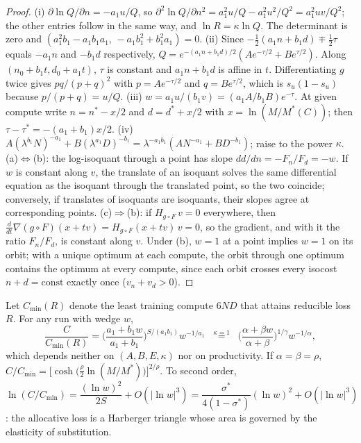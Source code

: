 \begin{proof}
(i) $\partial\ln Q/\partial n=-a_1u/Q$, so $\partial^2\ln Q/\partial n^2=a_1^2u/Q-a_1^2u^2/Q^2=a_1^2uv/Q^2$; the other
entries follow in the same way, and $\ln R=\kappa\ln Q$. The determinant is zero and
$(a_1^2b_1-a_1b_1a_1,\,-a_1b_1^2+b_1^2a_1)=0$. (ii) Since $-\frac12(a_1n+b_1d)\mp\frac12\tau$ equals $-a_1n$ and $-b_1d$
respectively, $Q=e^{-(a_1n+b_1d)/2}(Ae^{-\tau/2}+Be^{\tau/2})$. Along $(n_0+b_1t,d_0+a_1t)$, $\tau$ is constant and
$a_1n+b_1d$ is affine in $t$. Differentiating $g$ twice gives $pq/(p+q)^2$ with $p=Ae^{-\tau/2}$ and $q=Be^{\tau/2}$, which
is $s_u(1-s_u)$ because $p/(p+q)=u/Q$. (iii) $w=a_1u/(b_1v)=(a_1A/b_1B)e^{-\tau}$. At given compute write
$n=n^*-x/2$ and $d=d^*+x/2$ with $x=\ln(M/M^*(C))$; then $\tau-\tau^*=-(a_1+b_1)x/2$.
(iv) $A(\lambda^{b_1}N)^{-a_1}+B(\lambda^{a_1}D)^{-b_1}=\lambda^{-a_1b_1}(AN^{-a_1}+BD^{-b_1})$; raise to the power $\kappa$.
(a)$\Leftrightarrow$(b): the log-isoquant through a point has slope $dd/dn=-F_n/F_d=-w$. If $w$ is constant along $v$,
the translate of an isoquant solves the same differential equation as the isoquant through the translated point, so the
two coincide; conversely, if translates of isoquants are isoquants, their slopes agree at corresponding points. (c)$\Rightarrow$(b):
if $H_{g\circ F}\,v=0$ everywhere, then $\tfrac{d}{dt}\nabla(g\circ F)(x+tv)=H_{g\circ F}(x+tv)\,v=0$, so the gradient,
and with it the ratio $F_n/F_d$, is constant along $v$. Under (b), $w=1$ at a point implies $w=1$ on its orbit; with a
unique optimum at each compute, the orbit through one optimum contains the optimum at every compute, since each orbit
crosses every isocost $n+d=\text{const}$ exactly once ($v_n+v_d>0$).
\end{proof}

\begin{lemma}\label{lem:ce}
Let $C_{\min}(R)$ denote the least training compute $6ND$ that attains reducible loss $R$. For any run with wedge $w$,
\begin{equation}\label{eq:A-ce}
\frac{C}{C_{\min}(R)}=\Big(\frac{a_1+b_1w}{a_1+b_1}\Big)^{S/(a_1b_1)}w^{-1/a_1}
\;\;\overset{\kappa=1}{=}\;\;\Big(\frac{\alpha+\beta w}{\alpha+\beta}\Big)^{1/\gamma}w^{-1/\alpha},
\end{equation}
which depends neither on $(A,B,E,\kappa)$ nor on productivity. If $\alpha=\beta=\rho$,
$C/C_{\min}=\big[\cosh\big(\tfrac\rho2\ln(M/M^*)\big)\big]^{2/\rho}$. To second order,
$\ln(C/C_{\min})=\dfrac{(\ln w)^2}{2S}+O(|\ln w|^3)=\dfrac{\sigma^*}{4(1-\sigma^*)}(\ln w)^2+O(|\ln w|^3)$: the allocative loss is a
Harberger triangle whose area is governed by the elasticity of substitution.
\end{lemma}

